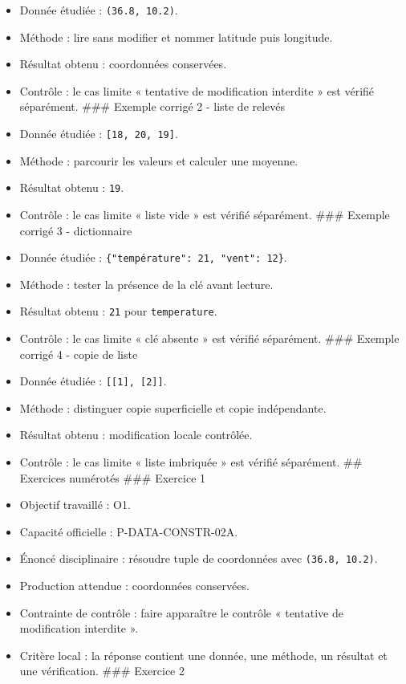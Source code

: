 \begin{itemize}
\tightlist
\item
  Donnée étudiée : \texttt{(36.8,\ 10.2)}.
\item
  Méthode : lire sans modifier et nommer latitude puis longitude.
\item
  Résultat obtenu : coordonnées conservées.
\item
  Contrôle : le cas limite « tentative de modification interdite » est
  vérifié séparément. \#\#\# Exemple corrigé 2 - liste de relevés
\item
  Donnée étudiée : \texttt{{[}18,\ 20,\ 19{]}}.
\item
  Méthode : parcourir les valeurs et calculer une moyenne.
\item
  Résultat obtenu : \texttt{19}.
\item
  Contrôle : le cas limite « liste vide » est vérifié séparément. \#\#\#
  Exemple corrigé 3 - dictionnaire
\item
  Donnée étudiée : \texttt{\{"température":\ 21,\ "vent":\ 12\}}.
\item
  Méthode : tester la présence de la clé avant lecture.
\item
  Résultat obtenu : \texttt{21} pour \texttt{temperature}.
\item
  Contrôle : le cas limite « clé absente » est vérifié séparément.
  \#\#\# Exemple corrigé 4 - copie de liste
\item
  Donnée étudiée : \texttt{{[}{[}1{]},\ {[}2{]}{]}}.
\item
  Méthode : distinguer copie superficielle et copie indépendante.
\item
  Résultat obtenu : modification locale contrôlée.
\item
  Contrôle : le cas limite « liste imbriquée » est vérifié séparément.
  \#\# Exercices numérotés \#\#\# Exercice 1
\item
  Objectif travaillé : O1.
\item
  Capacité officielle : P-DATA-CONSTR-02A.
\item
  Énoncé disciplinaire : résoudre tuple de coordonnées avec
  \texttt{(36.8,\ 10.2)}.
\item
  Production attendue : coordonnées conservées.
\item
  Contrainte de contrôle : faire apparaître le contrôle « tentative de
  modification interdite ».
\item
  Critère local : la réponse contient une donnée, une méthode, un
  résultat et une vérification. \#\#\# Exercice 2

\end{itemize}
